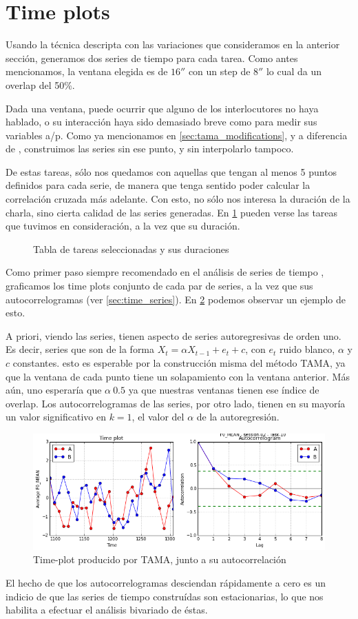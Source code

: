 \section{Time plots}

Usando la técnica descripta con las variaciones que consideramos en la anterior sección, generamos dos series de tiempo para cada tarea. Como antes mencionamos, la ventana elegida es de $16''$ con un step de $8''$ lo cual da un overlap del 50\%.

Dada una ventana, puede ocurrir que alguno de los interlocutores no haya hablado, o su interacción haya sido demasiado breve como para medir sus variables a/p. Como ya mencionamos en \ref{sec:tama_modifications}, y a diferencia de \cite{KOU2008.2}, construimos las series sin ese punto, y sin interpolarlo tampoco.

De estas tareas, sólo nos quedamos con aquellas que tengan al menos 5 puntos definidos para cada serie, de manera que tenga sentido poder calcular la correlación cruzada más adelante. Con esto, no sólo nos interesa la duración de la charla, sino cierta calidad de las series generadas. En \ref{fig:time_series_table} pueden verse las tareas que tuvimos en consideración, a la vez que su duración.

\begin{figure}
\centering

\caption{Tabla de tareas seleccionadas y sus duraciones}
\label{fig:time_series_table}
\end{figure}


Como primer paso siempre recomendado en el análisis de series de tiempo \cite{CHATFIELD}, graficamos los time plots conjunto de cada par de series, a la vez que sus autocorrelogramas (ver \ref{sec:time_series}). En \ref{fig:time_plot} podemos observar un ejemplo de esto.

A priori, viendo las series, tienen aspecto de series autoregresivas de orden uno. Es decir, series que son de la forma $X_t = \alpha X_{t-1} + e_t + c$, con $e_t$ ruido blanco, $\alpha$ y $c$ constantes. esto es esperable  por la construcción misma del método TAMA, ya que la ventana de cada punto tiene un solapamiento con la ventana anterior. Más aún, uno esperaría que $\alpha ~ 0.5$ ya que nuestras ventanas tienen ese índice de overlap. Los autocorrelogramas de las series, por otro lado, tienen en su mayoría un valor significativo en $k = 1$, el valor del $\alpha$ de la autoregresión.


\begin{figure}
\centering
\includegraphics[width=15cm]{images/time_plot_with_autocorrelation.png}
\caption{Time-plot producido por TAMA, junto a su autocorrelación}
\label{fig:time_plot}
\end{figure}

El hecho de que los autocorrelogramas desciendan rápidamente a cero es un indicio de que las series de tiempo construídas son estacionarias, lo que nos habilita a efectuar el análisis bivariado de éstas.
